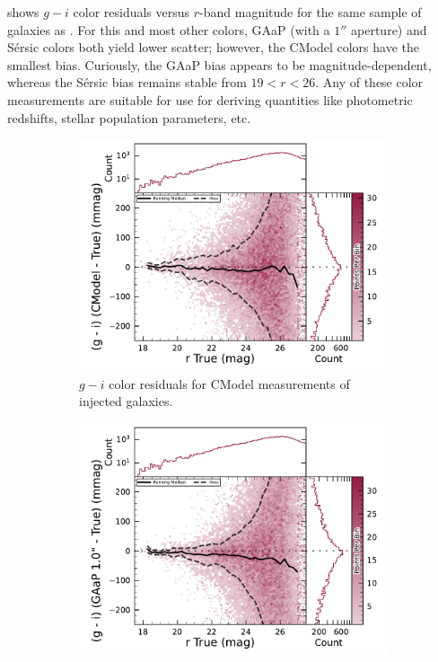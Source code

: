  shows $g-i$ color residuals versus $r$-band magnitude for the same sample of galaxies as .
For this and most other colors, \gls{GAaP} (with a $1''$ aperture) and S\'ersic colors both yield lower scatter; however, the CModel colors have the smallest bias.
Curiously, the \gls{GAaP} bias appears to be magnitude-dependent, whereas the S\'ersic bias remains stable from $19<r<26$.
Any of these color measurements are suitable for use for deriving quantities like photometric redshifts, stellar population parameters, etc.

\begin{figure}[hbt!]
  \centering
  \begin{subfigure}[t]{0.31\textwidth}
\includegraphics[width=\linewidth]{injected_lsst_cells_v1_5063_r_color_cmodel_g_minus_i}
  \caption{$g-i$ color residuals for CModel measurements of injected galaxies.}
  \end{subfigure}\hfill
  \begin{subfigure}[t]{0.31\textwidth}
\includegraphics[width=\linewidth]{injected_lsst_cells_v1_5063_r_color_gaap_g_minus_i}

\end{subfigure}
\end{figure}
